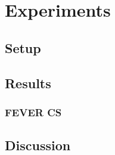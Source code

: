 \chapter{Experiments}

\section{Setup}

\section{Results}
\subsection{\CTK}
\subsection{FEVER CS}

\section{Discussion}
